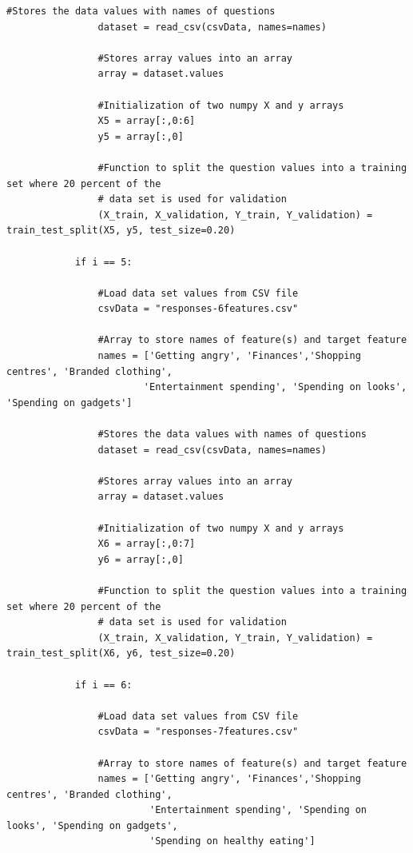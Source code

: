 \documentclass[a4paper, 12pt]{article}
\begin{document}
\begin{lstlisting}[frame = single]
                #Stores the data values with names of questions
                dataset = read_csv(csvData, names=names)

                #Stores array values into an array
                array = dataset.values

                #Initialization of two numpy X and y arrays
                X5 = array[:,0:6]
                y5 = array[:,0]

                #Function to split the question values into a training set where 20 percent of the 
                # data set is used for validation
                (X_train, X_validation, Y_train, Y_validation) = train_test_split(X5, y5, test_size=0.20)

            if i == 5:

                #Load data set values from CSV file
                csvData = "responses-6features.csv"    

                #Array to store names of feature(s) and target feature
                names = ['Getting angry', 'Finances','Shopping centres', 'Branded clothing',
                        'Entertainment spending', 'Spending on looks', 'Spending on gadgets']
    
                #Stores the data values with names of questions
                dataset = read_csv(csvData, names=names)

                #Stores array values into an array
                array = dataset.values

                #Initialization of two numpy X and y arrays
                X6 = array[:,0:7]
                y6 = array[:,0]

                #Function to split the question values into a training set where 20 percent of the 
                # data set is used for validation
                (X_train, X_validation, Y_train, Y_validation) = train_test_split(X6, y6, test_size=0.20)

            if i == 6:

                #Load data set values from CSV file
                csvData = "responses-7features.csv"    

                #Array to store names of feature(s) and target feature
                names = ['Getting angry', 'Finances','Shopping centres', 'Branded clothing',
                         'Entertainment spending', 'Spending on looks', 'Spending on gadgets',
                         'Spending on healthy eating']
    

\end{lstlisting}
\end{document}
